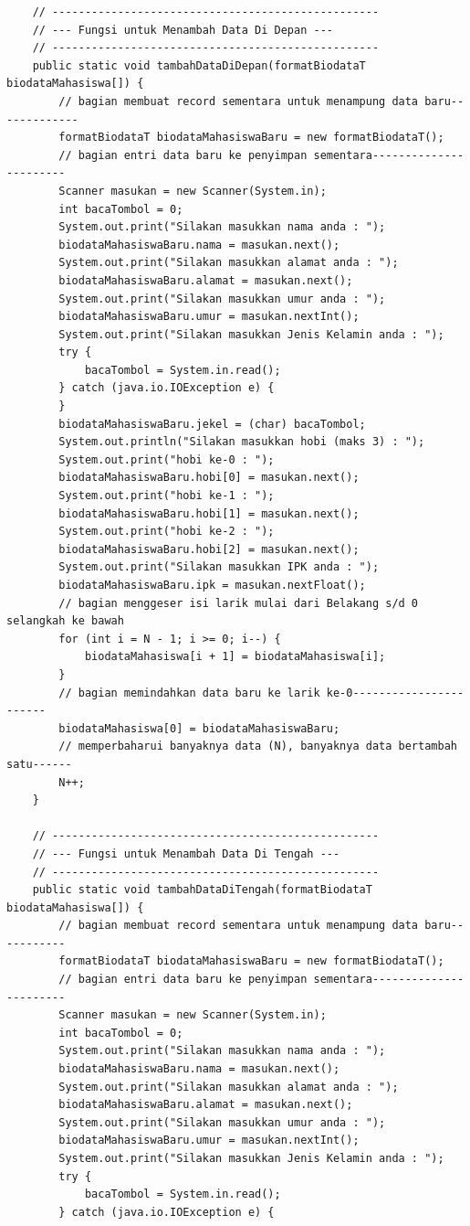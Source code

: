 \documentclass[a4paper,12pt]{article}
\begin{document}
\begin{lstlisting}
    // --------------------------------------------------
    // --- Fungsi untuk Menambah Data Di Depan ---
    // --------------------------------------------------
    public static void tambahDataDiDepan(formatBiodataT biodataMahasiswa[]) {
        // bagian membuat record sementara untuk menampung data baru-------------
        formatBiodataT biodataMahasiswaBaru = new formatBiodataT();
        // bagian entri data baru ke penyimpan sementara-----------------------
        Scanner masukan = new Scanner(System.in);
        int bacaTombol = 0;
        System.out.print("Silakan masukkan nama anda : ");
        biodataMahasiswaBaru.nama = masukan.next();
        System.out.print("Silakan masukkan alamat anda : ");
        biodataMahasiswaBaru.alamat = masukan.next();
        System.out.print("Silakan masukkan umur anda : ");
        biodataMahasiswaBaru.umur = masukan.nextInt();
        System.out.print("Silakan masukkan Jenis Kelamin anda : ");
        try {
            bacaTombol = System.in.read();
        } catch (java.io.IOException e) {
        }
        biodataMahasiswaBaru.jekel = (char) bacaTombol;
        System.out.println("Silakan masukkan hobi (maks 3) : ");
        System.out.print("hobi ke-0 : ");
        biodataMahasiswaBaru.hobi[0] = masukan.next();
        System.out.print("hobi ke-1 : ");
        biodataMahasiswaBaru.hobi[1] = masukan.next();
        System.out.print("hobi ke-2 : ");
        biodataMahasiswaBaru.hobi[2] = masukan.next();
        System.out.print("Silakan masukkan IPK anda : ");
        biodataMahasiswaBaru.ipk = masukan.nextFloat();
        // bagian menggeser isi larik mulai dari Belakang s/d 0 selangkah ke bawah
        for (int i = N - 1; i >= 0; i--) {
            biodataMahasiswa[i + 1] = biodataMahasiswa[i];
        }
        // bagian memindahkan data baru ke larik ke-0-----------------------
        biodataMahasiswa[0] = biodataMahasiswaBaru;
        // memperbaharui banyaknya data (N), banyaknya data bertambah satu------
        N++;
    }

    // --------------------------------------------------
    // --- Fungsi untuk Menambah Data Di Tengah ---
    // --------------------------------------------------
    public static void tambahDataDiTengah(formatBiodataT biodataMahasiswa[]) {
        // bagian membuat record sementara untuk menampung data baru-----------
        formatBiodataT biodataMahasiswaBaru = new formatBiodataT();
        // bagian entri data baru ke penyimpan sementara-----------------------
        Scanner masukan = new Scanner(System.in);
        int bacaTombol = 0;
        System.out.print("Silakan masukkan nama anda : ");
        biodataMahasiswaBaru.nama = masukan.next();
        System.out.print("Silakan masukkan alamat anda : ");
        biodataMahasiswaBaru.alamat = masukan.next();
        System.out.print("Silakan masukkan umur anda : ");
        biodataMahasiswaBaru.umur = masukan.nextInt();
        System.out.print("Silakan masukkan Jenis Kelamin anda : ");
        try {
            bacaTombol = System.in.read();
        } catch (java.io.IOException e) {


\end{lstlisting}
\end{document}
